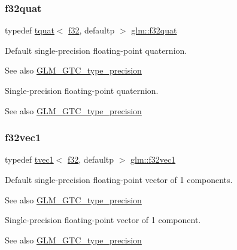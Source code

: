 \subsubsection{\texorpdfstring{f32quat}{f32quat}}
{\footnotesize\ttfamily typedef \hyperlink{structglm_1_1tquat}{tquat}$<$ \hyperlink{group__gtc__type__precision_ga0ec999b57f5330d9021256e96038df04}{f32}, defaultp $>$ \hyperlink{group__gtc__type__precision_gac59c4d798396552e4bbb866b3d8a2f18}{glm\+::f32quat}}

Default single-\/precision floating-\/point quaternion. \begin{DoxySeeAlso}{See also}
\hyperlink{group__gtc__type__precision}{G\+L\+M\+\_\+\+G\+T\+C\+\_\+type\+\_\+precision}
\end{DoxySeeAlso}
Single-\/precision floating-\/point quaternion. \begin{DoxySeeAlso}{See also}
\hyperlink{group__gtc__type__precision}{G\+L\+M\+\_\+\+G\+T\+C\+\_\+type\+\_\+precision} 
\end{DoxySeeAlso}
\mbox{\label{group__gtc__type__precision_ga6fb588b465f2252b473582159c31c40c}} 
\subsubsection{\texorpdfstring{f32vec1}{f32vec1}}
{\footnotesize\ttfamily typedef \hyperlink{structglm_1_1tvec1}{tvec1}$<$ \hyperlink{group__gtc__type__precision_ga0ec999b57f5330d9021256e96038df04}{f32}, defaultp $>$ \hyperlink{group__gtc__type__precision_ga6fb588b465f2252b473582159c31c40c}{glm\+::f32vec1}}

Default single-\/precision floating-\/point vector of 1 components. \begin{DoxySeeAlso}{See also}
\hyperlink{group__gtc__type__precision}{G\+L\+M\+\_\+\+G\+T\+C\+\_\+type\+\_\+precision}
\end{DoxySeeAlso}
Single-\/precision floating-\/point vector of 1 component. \begin{DoxySeeAlso}{See also}
\hyperlink{group__gtc__type__precision}{G\+L\+M\+\_\+\+G\+T\+C\+\_\+type\+\_\+precision} 
\end{DoxySeeAlso}
\mbox{\label{group__gtc__type__precision_ga8681dee3524dea86388178c49c27079a}} 
